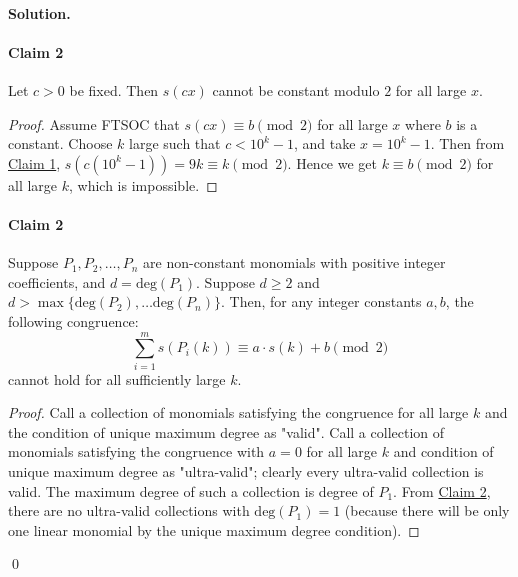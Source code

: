 \documentclass[12pt]{article}
\newenvironment{solution}
{\paragraph{Solution.}}
{\qed\eject}
\newcommand{\hyt}[2]{\hypertarget{#1 Claim #2}{\paragraph{Claim #2}}}
\newcommand{\hyr}[2]{\hyperlink{#1 Claim #2}{Claim #2}}
\begin{document}
\begin{solution}
\hyt{B}{2} Let $c>0$ be fixed. Then $s(cx)$ cannot be constant modulo $2$ for all large $x$.
\begin{proof}
    Assume FTSOC that $s(cx) \equiv b \pmod 2$ for all large $x$ where $b$ is a constant. Choose $k$ large such that $c<10^k -1$, and take $x=10^k-1$. Then from \hyr{B}{1}, $s(c(10^k-1))=9k \equiv k \pmod 2$. Hence we get $k \equiv b \pmod 2$ for all large $k$, which is impossible.
\end{proof}

\hyt{B}{2} Suppose $P_1,P_2, \dots ,P_n$ are non-constant monomials with positive integer coefficients, and $d=\text{deg}(P_1)$. Suppose $d \geq 2$ and $d>\max\{\text{deg}(P_2), \dots \text{deg}(P_n)\}$. Then, for any integer constants $a,b$, the following congruence:
$$\sum_{i=1}^m s(P_i(k)) \equiv a \cdot s(k)+b \pmod 2$$
cannot hold for all sufficiently large $k$.
\begin{proof}
    Call a collection of monomials satisfying the congruence for all large $k$ and the condition of unique maximum degree as "valid". Call a collection of monomials satisfying the congruence  with $a=0$ for all large $k$ and condition of unique maximum degree as "ultra-valid"; clearly every ultra-valid collection is valid. The maximum degree of such a collection is degree of $P_1$. From \hyr{B}{2}, there are no ultra-valid collections with $\text{deg}(P_1)=1$ (because there will be only one linear monomial by the unique maximum degree condition).
    

\end{proof}
\end{solution}
\end{document}
